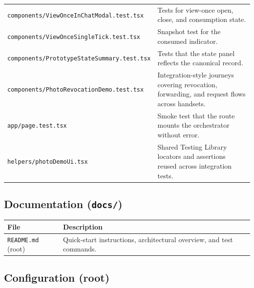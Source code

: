 \begin{center}
\begin{tabular}{@{}P{5.8cm}P{8.0cm}@{}}
\texttt{components/ViewOnceInChatModal.\linebreak[0]test.tsx} & Tests for view-once open, close, and consumption state. \\
\texttt{components/ViewOnceSingleTick.\linebreak[0]test.tsx} & Snapshot test for the consumed indicator. \\
\texttt{components/PrototypeStateSummary.\linebreak[0]test.tsx} & Tests that the state panel reflects the canonical record. \\
\texttt{components/PhotoRevocationDemo.\linebreak[0]test.tsx} & Integration-style journeys covering revocation, forwarding, and request flows across handsets. \\
\texttt{app/page.test.tsx} & Smoke test that the route mounts the orchestrator without error. \\
\texttt{helpers/photoDemoUi.tsx} & Shared Testing Library locators and assertions reused across integration tests. \\
\hline
\end{tabular}
\end{center}

\subsection*{Documentation (\texttt{docs/})}

\begin{center}
\small
\begin{tabular}{@{}P{4.6cm}P{9.0cm}@{}}
\hline
\textbf{File} & \textbf{Description} \\
\hline
\texttt{README.md} (root) & Quick-start instructions, architectural overview, and test commands. \\
\hline
\end{tabular}
\end{center}

\subsection*{Configuration (root)}

